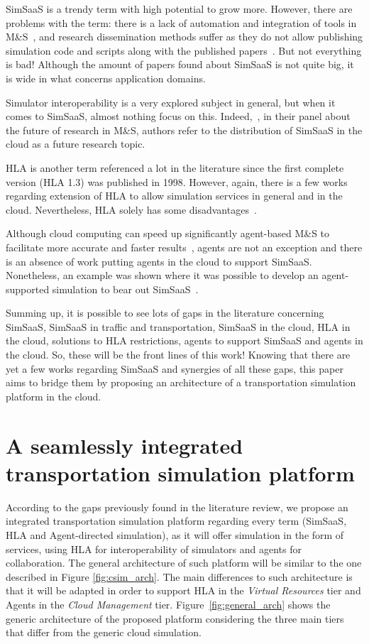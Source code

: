 \documentclass[conference]{IEEEtran}
\begin{document}
SimSaaS is a trendy term with high potential to grow more. However, there are problems with the term: there is a lack of automation and integration of tools in M\&S~\cite{Wang:2015:SSM:2723553.2723554}, and research dissemination methods suffer as they do not allow publishing simulation code and scripts along with the published papers~\cite{Sliman2013611}. But not everything is bad! Although the amount of papers found about SimSaaS is not quite big, it is wide in what concerns application domains.

Simulator interoperability is a very explored subject in general, but when it comes to SimSaaS, almost nothing focus on this. Indeed,~\cite{Yilmaz:2014:PFR:2693848.2694204}, in their panel about the future of research in M\&S, authors refer to the distribution of SimSaaS in the cloud as a future research topic.

HLA is another term referenced a lot in the literature since the first complete version (HLA 1.3) was published in 1998. However, again, there is a few works regarding extension of HLA to allow simulation services in general and in the cloud. Nevertheless, HLA solely has some disadvantages~\cite{Yilmaz01092006}\cite{Tolk:2010:UFA:2433508.2433550}.

Although cloud computing can speed up significantly agent-based M\&S to facilitate more accurate and faster results~\cite{Taylor:2014:TCC:2693848.2693884}, agents are not an exception and there is an absence of work putting agents in the cloud to support SimSaaS. Nonetheless, an example was shown where it was possible to develop an agent-supported simulation to bear out SimSaaS~\cite{Shao:2009:SSE:1639809.1639859}.

Summing up, it is possible to see lots of gaps in the literature concerning SimSaaS, SimSaaS in traffic and transportation, SimSaaS in the cloud, HLA in the cloud, solutions to HLA restrictions, agents to support SimSaaS and agents in the cloud. So, these will be the front lines of this work! Knowing that there are yet a few works regarding SimSaaS and synergies of all these gaps, this paper aims to bridge them by proposing an architecture of a transportation simulation platform in the cloud. 


\section{A seamlessly integrated transportation simulation platform}

According to the gaps previously found in the literature review, we propose an integrated transportation simulation platform regarding every term (SimSaaS, HLA and Agent-directed simulation), as it will offer simulation in the form of services, using HLA for interoperability of simulators and agents for collaboration. The general architecture of such platform will be similar to the one described in Figure \ref{fig:csim_arch}. The main differences to such architecture is that it will be adapted in order to support HLA in the \textit{Virtual Resources} tier and Agents in the \textit{Cloud Management} tier. Figure~\ref{fig:general_arch} shows the generic architecture of the proposed platform considering the three main tiers that differ from the generic cloud simulation.
\end{document}
